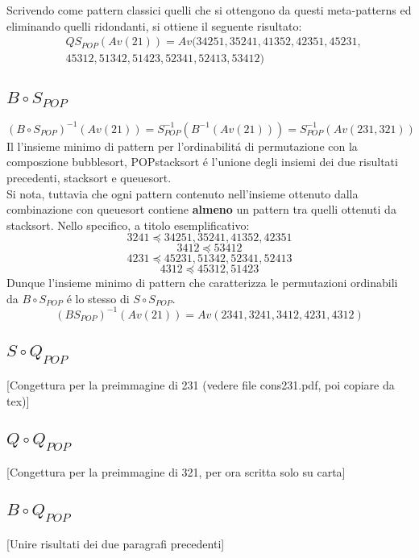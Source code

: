 Scrivendo come pattern classici quelli che si ottengono da questi meta-patterns ed eliminando quelli ridondanti, si ottiene il seguente risultato:
\begin{eqnarray*}
&Q{S_{POP}}(Av(21)) = Av(34251, 35241, 41352, 42351, 45231, \\
& 45312, 51342, 51423, 52341, 52413, 53412)
\end{eqnarray*}
\subsection*{$B\circ{S_{POP}}$}
$$(B\circ{S}_{POP})^{-1}(Av(21)) = S_{POP}^{-1}(B^{-1}(Av(21))) = S_{POP}^{-1}(Av(231,321))$$
Il l'insieme minimo di pattern per l'ordinabilit\'a di permutazione con la composzione bubblesort, POPstacksort \'e l'unione degli insiemi dei due risultati precedenti, stacksort e queuesort.\\
Si nota, tuttavia che ogni pattern contenuto nell'insieme ottenuto dalla combinazione con queuesort contiene \textbf{almeno} un pattern tra quelli ottenuti da stacksort. Nello specifico, a titolo esemplificativo:$$3241\preceq34251, 35241, 41352, 42351$$$$3412\preceq53412$$$$4231\preceq45231, 51342, 52341, 52413$$$$4312\preceq45312, 51423$$ 
Dunque l'insieme minimo di pattern che caratterizza le permutazioni ordinabili da $B\circ{S}_{POP}$ \'e lo stesso di $S\circ{S}_{POP}$.
$$(B{S_{POP}})^{-1}(Av(21)) = Av(2341, 3241, 3412, 4231, 4312)$$
\subsection*{$S\circ{Q_{POP}}$}
[Congettura per la preimmagine di 231 (vedere file cons231.pdf, poi copiare da tex)]
\subsection*{$Q\circ{Q_{POP}}$}
[Congettura per la preimmagine di 321, per ora scritta solo su carta]
\subsection*{$B\circ{Q_{POP}}$}
[Unire risultati dei due paragrafi precedenti]
